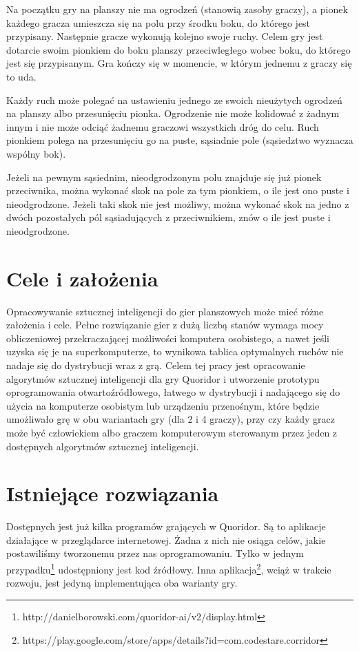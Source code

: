 \documentclass{pracamgr}
\begin{document}
Na początku gry na planszy nie ma ogrodzeń (stanowią zasoby graczy), a pionek każdego gracza umieszcza się na polu przy środku boku, do którego jest przypisany.
Następnie gracze wykonują kolejno swoje ruchy. Celem gry jest dotarcie swoim pionkiem do boku planszy przeciwległego wobec boku, do którego jest się przypisanym. Gra kończy się w momencie, w którym jednemu z graczy się to uda.

Każdy ruch może polegać na ustawieniu jednego ze swoich nieużytych ogrodzeń na planszy albo przesunięciu pionka. Ogrodzenie nie może kolidować z żadnym innym i nie może odciąć żadnemu graczowi wszystkich dróg do celu. Ruch pionkiem polega na przesunięciu go na puste, sąsiadnie pole (sąsiedztwo wyznacza wspólny bok).

Jeżeli na pewnym sąsiednim, nieodgrodzonym polu znajduje się już pionek przeciwnika, można wykonać skok na pole za tym pionkiem, o ile jest ono puste i nieodgrodzone. Jeżeli taki skok nie jest możliwy, można wykonać skok na jedno z dwóch pozostałych pól sąsiadujących z przeciwnikiem, znów o ile jest puste i nieodgrodzone.

\section{Cele i założenia}

Opracowywanie sztucznej inteligencji do gier planszowych może mieć różne założenia i cele.
Pełne rozwiązanie gier z dużą liczbą stanów wymaga mocy obliczeniowej przekraczającej możliwości komputera osobistego, a nawet jeśli uzyska się je na superkomputerze, to wynikowa tablica optymalnych ruchów nie nadaje się do dystrybucji wraz z grą.
Celem tej pracy jest opracowanie algorytmów sztucznej inteligencji dla gry Quoridor i utworzenie prototypu oprogramowania otwartoźródłowego, łatwego w dystrybucji i nadającego się do użycia na komputerze osobistym lub urządzeniu przenośnym, które będzie umożliwało grę w obu wariantach gry (dla 2 i 4 graczy), przy czy każdy gracz może być człowiekiem albo graczem komputerowym sterowanym przez jeden z dostępnych algorytmów sztucznej inteligencji.

\section{Istniejące rozwiązania}

Dostępnych jest już kilka programów grających w Quoridor. Są to aplikacje działające w przeglądarce internetowej. Żadna z nich nie osiąga celów, jakie postawiliśmy tworzonemu przez nas oprogramowaniu.
Tylko w jednym przypadku\footnote{http://danielborowski.com/quoridor-ai/v2/display.html} udostępniony jest kod źródłowy.
Inna aplikacja\footnote{https://play.google.com/store/apps/details?id=com.codestare.corridor}, wciąż w trakcie rozwoju, jest jedyną implementująca oba warianty gry.
\end{document}
